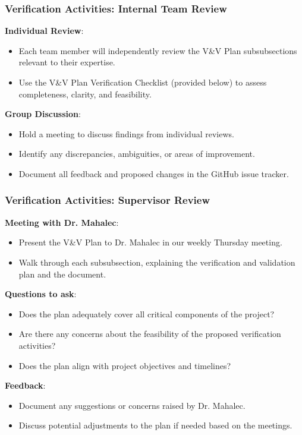 \documentclass[12pt, titlepage]{article}
\begin{document}
\subsubsection{Verification Activities: Internal Team Review}
\textbf{Individual Review}:
\begin{itemize}
    \item Each team member will independently review the V\&V Plan subsubsections relevant to their expertise.
    \item Use the V\&V Plan Verification Checklist (provided below) to assess completeness, clarity, and feasibility.
\end{itemize}


\textbf{Group Discussion}:
\begin{itemize}
    \item Hold a meeting to discuss findings from individual reviews.
    \item Identify any discrepancies, ambiguities, or areas of improvement.
    \item Document all feedback and proposed changes in the GitHub issue tracker.
\end{itemize}

\subsubsection{Verification Activities: Supervisor Review}

\textbf{Meeting with Dr. Mahalec}:
\begin{itemize}
    \item Present the V\&V Plan to Dr. Mahalec in our weekly Thursday meeting.
    \item Walk through each subsubsection, explaining the verification and validation plan and the document.
\end{itemize}

\textbf{Questions to ask}:
\begin{itemize}
    \item Does the plan adequately cover all critical components of the project?
    \item Are there any concerns about the feasibility of the proposed verification activities?
    \item Does the plan align with project objectives and timelines?
\end{itemize}

\textbf{Feedback}:
\begin{itemize}
    \item Document any suggestions or concerns raised by Dr. Mahalec.
    \item Discuss potential adjustments to the plan if needed based on the meetings.
\end{itemize}
\end{document}
